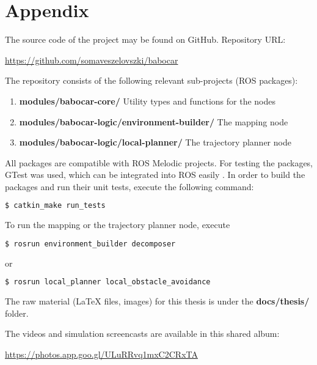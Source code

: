 \chapter*{Appendix}

The source code of the project may be found on GitHub. Repository URL:

\begin{center}
\href{https://github.com/somaveszelovszki/babocar}{https://github.com/somaveszelovszki/babocar}
\end{center}

The repository consists of the following relevant sub-projects (ROS packages):

\begin{enumerate}
\item \textbf{modules/babocar-core/} Utility types and functions for the nodes
\item \textbf{modules/babocar-logic/environment-builder/} The mapping node
\item \textbf{modules/babocar-logic/local-planner/} The trajectory planner node
\end{enumerate}

All packages are compatible with ROS Melodic projects. For testing the packages, GTest \cite{gtest} was used, which can be integrated into ROS easily \cite{ros_gtest}. In order to build the packages and run their unit tests, execute the following command:

\begin{lstlisting}[language=bash]
$ catkin_make run_tests
\end{lstlisting}

To run the mapping or the trajectory planner node, execute

\begin{lstlisting}[language=bash]
$ rosrun environment_builder decomposer
\end{lstlisting}

or

\begin{lstlisting}[language=bash]
$ rosrun local_planner local_obstacle_avoidance
\end{lstlisting}

The raw material (LaTeX files, images) for this thesis is under the \textbf{docs/thesis/} folder.

The videos and simulation screencasts are available in this shared album:

\begin{center}
	\href{https://photos.app.goo.gl/ULuRRvq1mxC2CRxTA}{https://photos.app.goo.gl/ULuRRvq1mxC2CRxTA}
\end{center}